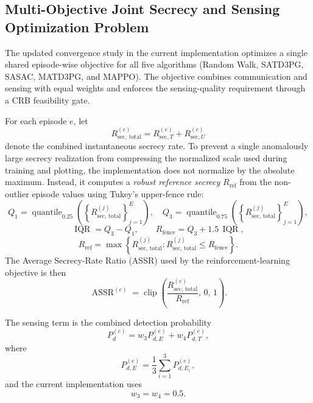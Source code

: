 \documentclass[journal,onecolumn]{IEEEtran}
\begin{document}
\subsection{Multi-Objective Joint Secrecy and Sensing Optimization Problem}
The updated convergence study in the current implementation optimizes a single shared episode-wise objective for all five algorithms (Random Walk, SATD3PG, SASAC, MATD3PG, and MAPPO). The objective combines communication and sensing with equal weights and enforces the sensing-quality requirement through a CRB feasibility gate.

For each episode $e$, let
\begin{equation}
    R_{\text{sec, total}}^{(e)} = R_{\text{sec}, T}^{(e)} + R_{\text{sec}, U}^{(e)}
\end{equation}
denote the combined instantaneous secrecy rate. To prevent a single anomalously large secrecy realization from compressing the normalized scale used during training and plotting, the implementation does not normalize by the absolute maximum. Instead, it computes a \emph{robust reference secrecy} $R_{\text{ref}}$ from the non-outlier episode values using Tukey's upper-fence rule:
\begin{equation}
    Q_1 = \operatorname{quantile}_{0.25}\!\left(\left\{R_{\text{sec, total}}^{(j)}\right\}_{j=1}^{E}\right), \quad
    Q_3 = \operatorname{quantile}_{0.75}\!\left(\left\{R_{\text{sec, total}}^{(j)}\right\}_{j=1}^{E}\right),
\end{equation}
\begin{equation}
    \operatorname{IQR} = Q_3 - Q_1, \qquad
    R_{\text{fence}} = Q_3 + 1.5\,\operatorname{IQR},
\end{equation}
\begin{equation}
    R_{\text{ref}} = \max \left\{ R_{\text{sec, total}}^{(j)} : R_{\text{sec, total}}^{(j)} \le R_{\text{fence}} \right\}.
\end{equation}
The Average Secrecy-Rate Ratio (ASSR) used by the reinforcement-learning objective is then
\begin{equation}
    \operatorname{ASSR}^{(e)} = \operatorname{clip}\!\left(\frac{R_{\text{sec, total}}^{(e)}}{R_{\text{ref}}},\, 0,\, 1\right).
\end{equation}

The sensing term is the combined detection probability
\begin{equation}
    P_d^{(e)} = w_3 P_{d,E}^{(e)} + w_4 P_{d,T}^{(e)},
\end{equation}
where
\begin{equation}
    P_{d,E}^{(e)} = \frac{1}{3}\sum_{i=1}^{3} P_{d,E_i}^{(e)},
\end{equation}
and the current implementation uses
\begin{equation}
    w_3 = w_4 = 0.5.
\end{equation}
\end{document}
